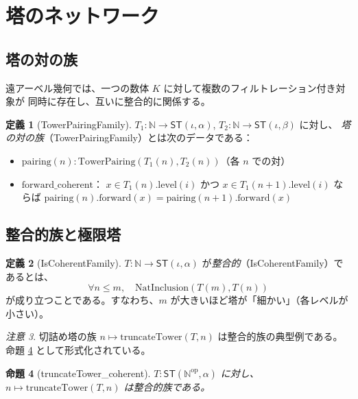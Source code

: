 \documentclass[a4paper,11pt]{ltjsarticle}
\theoremstyle{definition}
\newtheorem{definition}{定義}[section]
\theoremstyle{plain}
\newtheorem{proposition}[definition]{命題}
\theoremstyle{remark}
\newtheorem{remark}[definition]{注意}
\newcommand{\ST}{\mathsf{ST}}
\newcommand{\Nat}{\mathbb{N}}
\newcommand{\Nod}{\mathbb{N}^{\mathrm{op}}}
\begin{document}
\section{塔のネットワーク}
\label{sec:network}

\subsection{塔の対の族}

遠アーベル幾何では、一つの数体 $K$ に対して複数のフィルトレーション付き対象が
同時に存在し、互いに整合的に関係する。

\begin{definition}[TowerPairingFamily]
$T_1 : \Nat \to \ST(\iota, \alpha)$, $T_2 : \Nat \to \ST(\iota, \beta)$ に対し、
\emph{塔の対の族}（TowerPairingFamily）とは次のデータである：
\begin{itemize}
  \item $\mathrm{pairing}(n) : \mathrm{TowerPairing}(T_1(n), T_2(n))$（各 $n$ での対）
  \item $\mathrm{forward\_coherent}$：
    $x \in T_1(n).\mathrm{level}(i)$ かつ $x \in T_1(n+1).\mathrm{level}(i)$ ならば
    $\mathrm{pairing}(n).\mathrm{forward}(x) = \mathrm{pairing}(n+1).\mathrm{forward}(x)$
\end{itemize}
\end{definition}

\subsection{整合的族と極限塔}

\begin{definition}[IsCoherentFamily]
\label{def:coherent}
$T : \Nat \to \ST(\iota, \alpha)$ が\emph{整合的}（IsCoherentFamily）であるとは、
\[
  \forall n \leq m,\quad \mathrm{NatInclusion}(T(m), T(n))
\]
が成り立つことである。すなわち、$m$ が大きいほど塔が「細かい」（各レベルが小さい）。
\end{definition}

\begin{remark}
切詰め塔の族 $n \mapsto \mathrm{truncateTower}(T, n)$ は整合的族の典型例である。
命題 \ref{prop:trunccoherent} として形式化されている。
\end{remark}

\begin{proposition}[truncateTower\_coherent]
\label{prop:trunccoherent}
$T : \ST(\Nod, \alpha)$ に対し、
$n \mapsto \mathrm{truncateTower}(T, n)$ は整合的族である。
\end{proposition}
\end{document}
